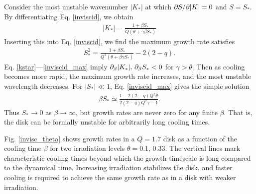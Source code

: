 Consider the most unstable wavenumber $|K_*|$ at which $\partial S/\partial|K| =
0$ and $S = S_*$. By differentiating Eq. \ref{inviscid}, we obtain 
\begin{align}\label{kstar}
  |K_*| = \frac{1+\beta S_*}{Q\left(\theta + \gamma \beta S_*\right)}
\end{align}
Inserting this into Eq. \ref{inviscid}, we find the maximum growth
rate satisfies
\begin{align}\label{inviscid_max}
  S_*^2 = \frac{1+\beta S_*}{Q^2\left(\theta + \beta\gamma S_*\right)}
  - 2(2-q).
\end{align}
Eq. \ref{kstar}---\ref{inviscid_max} imply $\partial_\beta|K_*|,\,\partial_\beta
S_*<0 $ for $\gamma>\theta$. Then as cooling becomes more rapid, the maximum 
growth rate increases, and the most unstable wavelength decreases. 
For $|S_*|\ll1$, Eq. \ref{inviscid_max} gives the simple solution 
\begin{align}
  \beta S_*\simeq \frac{1-2(2-q)Q^2\theta}{2(2-q)Q^2\gamma-1}.  
\end{align} 
Thus $S_*\to0$ as $\beta\to\infty$, but growth rates are never zero
for any finite $\beta$. That is, the disk can be formally unstable for
arbitrarily long cooling times.     
 
Fig. \ref{invisc_theta} shows growth rates in a $Q=1.7$ disk  
as a function of the cooling time $\beta$ for two irradiation levels
$\theta=0.1,\,0.33$. The vertical lines mark characteristic cooling
times beyond which the growth timescale is long compared to the
dynamical time. Increasing irradiation stabilizes the
disk, and faster cooling is required to achieve the same growth 
rate as in a disk with weaker irradiation.  

